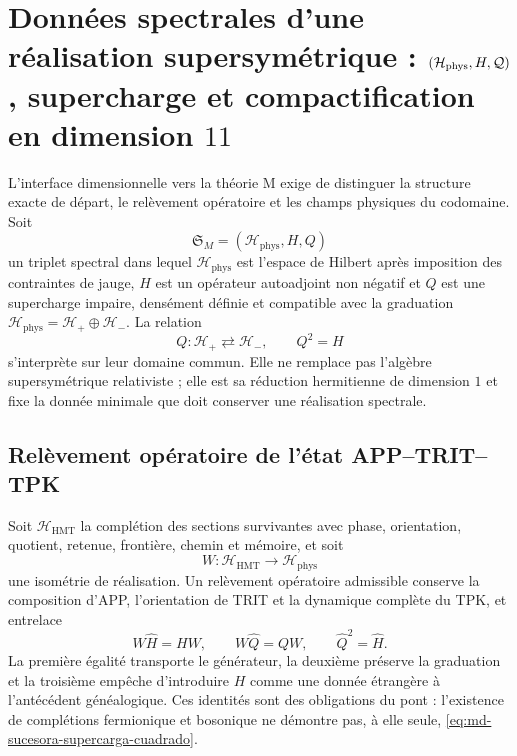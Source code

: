 \section{Données spectrales d'une réalisation supersymétrique : \((\mathcal H_{\rm phys},H,\mathcal Q)\), supercharge et compactification en dimension \(11\)}
\label{sec:md-sucesora-terna-supercarga-m}

L'interface dimensionnelle vers la théorie M exige de distinguer la structure exacte
de départ, le relèvement opératoire et les champs physiques du codomaine. Soit
\[
 \mathfrak S_M=(\mathcal H_{\mathrm{phys}},H,Q)
\]
un triplet spectral dans lequel \(\mathcal H_{\mathrm{phys}}\) est l'espace de
Hilbert après imposition des contraintes de jauge, \(H\) est un opérateur
autoadjoint non négatif et \(Q\) est une supercharge impaire, densément définie et
compatible avec la graduation
\(\mathcal H_{\mathrm{phys}}=\mathcal H_+\oplus\mathcal H_-\). La relation
\begin{equation}
 Q:\mathcal H_+\rightleftarrows\mathcal H_-,
 \qquad
 Q^2=H
 \label{eq:md-sucesora-supercarga-cuadrado}
\end{equation}
s'interprète sur leur domaine commun. Elle ne remplace pas l'algèbre supersymétrique
relativiste ; elle est sa réduction hermitienne de dimension \(1\) et fixe la donnée minimale
que doit conserver une réalisation spectrale.

\subsection{Relèvement opératoire de l'état APP--TRIT--TPK}

Soit \(\mathcal H_{\mathrm{HMT}}\) la complétion des sections
survivantes avec phase, orientation, quotient, retenue, frontière, chemin et
mémoire, et soit
\[
 W:\mathcal H_{\mathrm{HMT}}\longrightarrow\mathcal H_{\mathrm{phys}}
\]
une isométrie de réalisation. Un relèvement opératoire admissible conserve
la composition d'APP, l'orientation de TRIT et la dynamique complète du TPK,
et entrelace
\begin{equation}
 W\widehat H=HW,
 \qquad
 W\widehat Q=QW,
 \qquad
 \widehat Q^{2}=\widehat H.
 \label{eq:md-sucesora-lift-app-supercarga}
\end{equation}
La première égalité transporte le générateur, la deuxième préserve la graduation
et la troisième empêche d'introduire \(H\) comme une donnée étrangère à l'antécédent
généalogique. Ces identités sont des obligations du pont : l'existence de
complétions fermionique et bosonique ne démontre pas, à elle seule,
\eqref{eq:md-sucesora-supercarga-cuadrado}.

